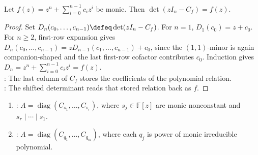 \begin{lemma} \label{lem:determinant-of-companion-matrix} \\
Let $f(z)=z^n+\sum_{i=0}^{n-1}c_iz^i$ be monic. Then $\det(zI_n-C_f)=f(z)$.
\begin{proof} Set $D_n(c_0,\ldots,c_{n-1})\defeq\det(zI_n-C_f)$. For $n=1$, $D_1(c_0)=z+c_0$.\\
For $n\geq2$, first-row expansion gives $D_n(c_0,\ldots,c_{n-1})=zD_{n-1}(c_1,\ldots,c_{n-1})+c_0$, since the $(1,1)$-minor is again companion-shaped and the last first-row cofactor contributes $c_0$. Induction gives $D_n=z^n+\sum_{i=0}^{n-1}c_iz^i=f(z)$.\\
: The last column of $C_f$ stores the coefficients of the polynomial relation.\\
: The shifted determinant reads that stored relation back as $f$.
\end{proof}
\end{lemma}

\begin{definition} \label{def:rational-canonical-block-forms} 
\begin{enumerate}[label=(\roman*)]
\setlength{\itemsep}{0pt}
\item {}: $A=\operatorname{diag}(C_{s_1},\ldots,C_{s_r})$, where $s_j\in\mathbb{F}[z]$ are monic nonconstant and $s_r\mid\cdots\mid s_1$.
\item {}: $A=\operatorname{diag}(C_{q_1},\ldots,C_{q_m})$, where each $q_j$ is power of monic irreducible polynomial.
\end{enumerate}
\end{definition}

